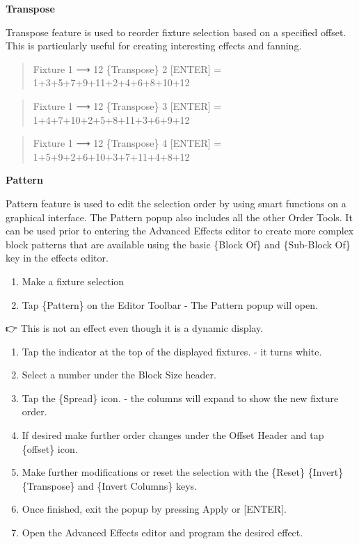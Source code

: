 \documentclass[
]{article}
\begin{document}
\textbf{Transpose}

Transpose feature is used to reorder fixture selection based on a specified offset.
This is particularly useful for creating interesting effects and fanning.

\begin{quote}
Fixture 1 ⟶ 12 \{Transpose\} 2 {[}ENTER{]} = 1+3+5+7+9+11+2+4+6+8+10+12
\end{quote}

\begin{quote}
Fixture 1 ⟶ 12 \{Transpose\} 3 {[}ENTER{]} = 1+4+7+10+2+5+8+11+3+6+9+12
\end{quote}

\begin{quote}
Fixture 1 ⟶ 12 \{Transpose\} 4 {[}ENTER{]} = 1+5+9+2+6+10+3+7+11+4+8+12
\end{quote}

\textbf{Pattern}

Pattern feature is used to edit the selection order by using smart functions on a graphical interface.
The Pattern popup also includes all the other Order Tools.
It can be used prior to entering the Advanced Effects editor to create more complex block patterns that are available using the basic \{Block Of\} and \{Sub-Block Of\} key in the effects editor.

\begin{enumerate}
\def\labelenumi{\arabic{enumi}.}
\item
  Make a fixture selection
\item
  Tap \{Pattern\} on the Editor Toolbar - The Pattern popup will open.
\end{enumerate}

👉 {This is not an effect even though it is a dynamic display.}

\begin{enumerate}
\def\labelenumi{\arabic{enumi}.}
\setcounter{enumi}{2}
\item
  Tap the indicator at the top of the displayed fixtures. - it turns white.
\item
  Select a number under the Block Size header.
\item
  Tap the \{Spread\} icon. - the columns will expand to show the new fixture order.
\item
  If desired make further order changes under the Offset Header and tap \{offset\} icon.
\item
  Make further modifications or reset the selection with the \{Reset\} \{Invert\} \{Transpose\} and \{Invert Columns\} keys.
\item
  Once finished, exit the popup by pressing Apply or {[}ENTER{]}.
\item
  Open the Advanced Effects editor and program the desired effect.
\end{enumerate}
\end{document}
